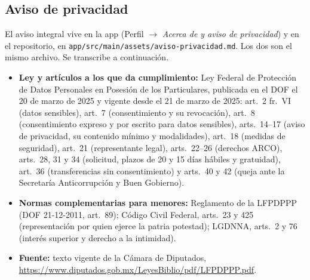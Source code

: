 \subsection{Aviso de privacidad}
El aviso integral vive en la app (Perfil $\rightarrow$ \emph{Acerca de y aviso de privacidad}) y en el repositorio, en \texttt{app/\allowbreak{}src/\allowbreak{}main/\allowbreak{}assets/\allowbreak{}aviso-privacidad.\allowbreak{}md}. Los dos son el mismo archivo. Se transcribe a continuación.

\begin{itemize}
	\item \textbf{Ley y artículos a los que da cumplimiento:} Ley Federal de Protección de Datos Personales en Posesión de los Particulares, publicada en el DOF el 20 de marzo de 2025 y vigente desde el 21 de marzo de 2025: art.~2 fr.~VI (datos sensibles), art.~7 (consentimiento y su revocación), art.~8 (consentimiento expreso y por escrito para datos sensibles), arts.~14--17 (aviso de privacidad, su contenido mínimo y modalidades), art.~18 (medidas de seguridad), art.~21 (representante legal), arts.~22--26 (derechos ARCO), arts.~28, 31 y 34 (solicitud, plazos de 20 y 15 días hábiles y gratuidad), art.~36 (transferencias sin consentimiento) y arts.~40 y 42 (queja ante la Secretaría Anticorrupción y Buen Gobierno).
	\item \textbf{Normas complementarias para menores:} Reglamento de la LFPDPPP (DOF 21-12-2011, art.~89); Código Civil Federal, arts.~23 y 425 (representación por quien ejerce la patria potestad); LGDNNA, arts.~2 y 76 (interés superior y derecho a la intimidad).
	\item \textbf{Fuente:} texto vigente de la Cámara de Diputados, \url{https://www.diputados.gob.mx/LeyesBiblio/pdf/LFPDPPP.pdf}.
\end{itemize}

